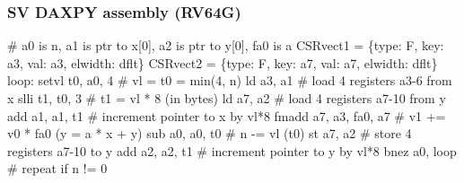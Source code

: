 \documentclass[slidestop]{beamer}
\begin{document}
\begin{frame}[fragile]
\frametitle{SV DAXPY assembly (RV64G)}

\begin{semiverbatim}
# a0 is n, a1 is ptr to x[0], a2 is ptr to y[0], fa0 is a
 CSRvect1 = \{type: F, key: a3, val: a3, elwidth: dflt\}
 CSRvect2 = \{type: F, key: a7, val: a7, elwidth: dflt\}
loop:
 setvl t0, a0, 4       # vl = t0 = min(4, n)
 ld    a3, a1          # load 4 registers a3-6 from x
 slli  t1, t0, 3       # t1 = vl * 8 (in bytes)
 ld    a7, a2          # load 4 registers a7-10 from y
 add   a1, a1, t1      # increment pointer to x by vl*8
 fmadd a7, a3, fa0, a7 # v1 += v0 * fa0 (y = a * x + y)
 sub   a0, a0, t0      # n -= vl (t0)
 st    a7, a2          # store 4 registers a7-10 to y
 add   a2, a2, t1      # increment pointer to y by vl*8
 bnez  a0, loop        # repeat if n != 0
\end{semiverbatim}
\end{frame}


\end{document}
